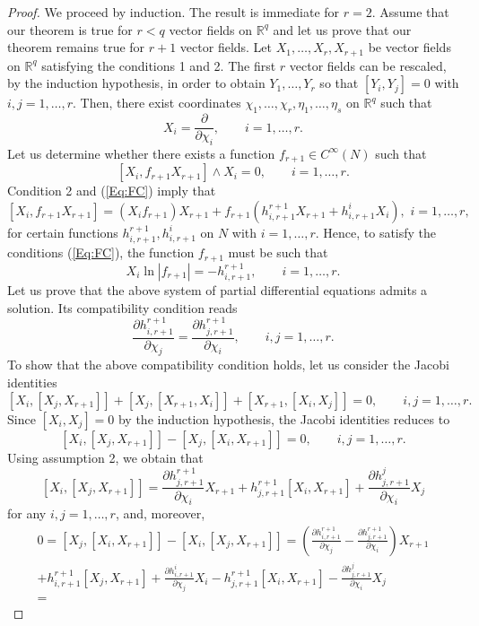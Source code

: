 \documentclass{birkjour}
\theoremstyle{definition}
\theoremstyle{remark}
\numberwithin{equation}{section}
\numberwithin{equation}{section}
\numberwithin{thm}{section}
\numberwithin{equation}{section}
\numberwithin{thm}{section}
\begin{document}
\begin{proof}
	We proceed by induction. The result is immediate for $r=2$. Assume that our theorem is true for $r<q$ vector fields on $\mathbb{R}^q$ and let us prove that our theorem remains true for $r+1$ vector fields. Let   $X_1,\ldots,X_r,X_{r+1}$ be vector fields on $\mathbb{R}^{q}$ satisfying the conditions 1 and 2. The first $r$ vector fields can be rescaled, by the induction hypothesis, in order to obtain $Y_1,\ldots,Y_r$ so  that $[Y_i,Y_j]=0$ with $i,j=1,\ldots,r$. Then, there exist coordinates $\chi_1,\ldots,\chi_r,\eta_1,\ldots,\eta_s$ on $\mathbb{R}^q$ such that
	$$
	X_i=\frac{\partial}{\partial \chi_i},\qquad i=1,\ldots,r.
	$$
	Let us determine whether  there exists a function $f_{r+1}\in C^\infty(N)$ such that 
	\begin{equation}\label{Eq:FC}
		[X_i,f_{r+1}X_{r+1}]\wedge X_{i}=0,\qquad i=1,\ldots,r.
	\end{equation}
	Condition 2 and (\ref{Eq:FC}) imply that
	$$
	[X_i,f_{r+1}X_{r+1}]=(X_if_{r+1})X_{r+1}+f_{r+1}(h_{i,r+1}^{r+1}X_{r+1}+h_{i,r+1}^iX_i),\,\, i=1,\ldots,r,
	$$
	for certain functions $h_{i,r+1}^{r+1},h_{i,r+1}^i$ on $N$ with $i=1,\ldots,r$. Hence, to satisfy the conditions (\ref{Eq:FC}), the function $f_{r+1}$ must be such that 
	\begin{equation}\label{Eq:SC}
		X_i\ln|f_{r+1}|=-h_{i,r+1}^{r+1},\qquad i=1,\ldots,r.
	\end{equation}
	Let us prove that the above system of partial differential equations admits a solution. Its compatibility condition reads
	$$
	\frac{\partial h_{i,r+1}^{r+1}}{\partial \chi_j}=\frac{\partial h_{j,r+1}^{r+1}}{\partial \chi_i},\qquad i,j=1,\ldots,r.
	$$
	To show that the above compatibility condition holds, let us consider the Jacobi identities
	$$
	[X_i,[X_j,X_{r+1}]]+[X_j,[X_{r+1},X_{i}]]+[X_{r+1},[X_i,X_j]]=0,\qquad i,j=1,\ldots,r.
	$$
	Since $[X_i,X_j]=0$ by the induction hypothesis, the Jacobi identities reduces to
	$$
	[X_i,[X_j,X_{r+1}]]-[X_j,[X_{i},X_{r+1}]]=0,\qquad i,j=1,\ldots,r.
	$$
	Using assumption 2, we obtain that 
	$$
	[X_i,[X_j,X_{r+1}]]=\frac{\partial h_{j,r+1}^{r+1}}{\partial \chi_i}X_{r+1}+h_{j,r+1}^{r+1}[X_i,X_{r+1}]+\frac{\partial h^{j}_{j,r+1}}{\partial \chi_i}X_j
	$$
	for any $i,j=1,\ldots,r$, and, moreover,
	\begin{multline*}
		0=[X_j,[X_i,X_{r+1}]]-[X_i,[X_j,X_{r+1}]]=\left(\frac{\partial h_{i,r+1}^{r+1}}{\partial \chi_j}-\frac{\partial h_{j,r+1}^{r+1}}{\partial \chi_i}\right)X_{r+1}\\+h_{i,r+1}^{r+1}[X_j,X_{r+1}]+\frac{\partial h^i_{i,r+1}}{\partial \chi_j}X_i-h_{j,r+1}^{r+1}[X_i,X_{r+1}]-\frac{\partial h^j_{j,r+1}}{\partial \chi_i}X_j\\=

\end{multline*}
\end{proof}
\end{document}
